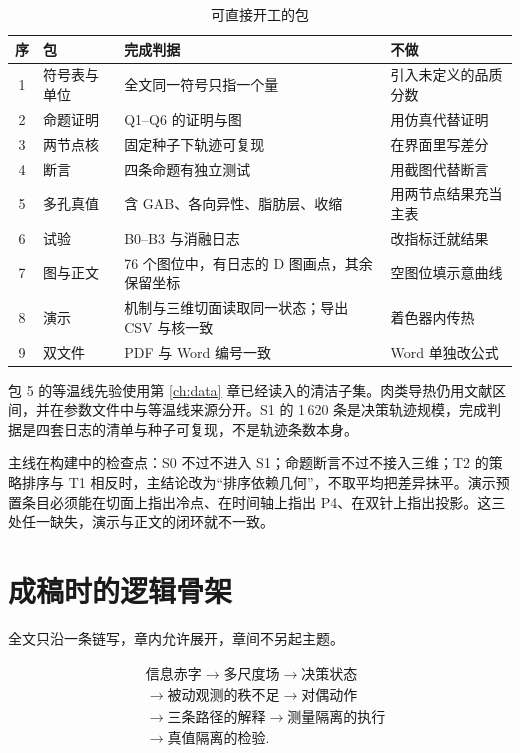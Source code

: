 \begin{table}[H]
\centering
\caption{可直接开工的包}
\begin{tabularx}{\textwidth}{clXX}
\toprule
序 & 包 & 完成判据 & 不做 \\
\midrule
1 & 符号表与单位 & 全文同一符号只指一个量 & 引入未定义的品质分数 \\
2 & 命题证明 & Q1--Q6 的证明与图 & 用仿真代替证明 \\
3 & 两节点核 & 固定种子下轨迹可复现 & 在界面里写差分 \\
4 & 断言 & 四条命题有独立测试 & 用截图代替断言 \\
5 & 多孔真值 & 含 GAB、各向异性、脂肪层、收缩 & 用两节点结果充当主表 \\
6 & 试验 & B0--B3 与消融日志 & 改指标迁就结果 \\
7 & 图与正文 & 76 个图位中，有日志的 D 图画点，其余保留坐标 & 空图位填示意曲线 \\
8 & 演示 & 机制与三维切面读取同一状态；导出 CSV 与核一致 & 着色器内传热 \\
9 & 双文件 & PDF 与 Word 编号一致 & Word 单独改公式 \\
\bottomrule
\end{tabularx}
\end{table}

包 5 的等温线先验使用第 \ref{ch:data} 章已经读入的清洁子集。肉类导热仍用文献区间，并在参数文件中与等温线来源分开。S1 的 1\,620 条是决策轨迹规模，完成判据是四套日志的清单与种子可复现，不是轨迹条数本身。

主线在构建中的检查点：S0 不过不进入 S1；命题断言不过不接入三维；T2 的策略排序与 T1 相反时，主结论改为“排序依赖几何”，不取平均把差异抹平。演示预置条目必须能在切面上指出冷点、在时间轴上指出 P4、在双针上指出投影。这三处任一缺失，演示与正文的闭环就不一致。

\section{成稿时的逻辑骨架}

全文只沿一条链写，章内允许展开，章间不另起主题。

\[
\begin{aligned}
&\text{信息赤字}
\to\text{多尺度场}
\to\text{决策状态}\\
&\to\text{被动观测的秩不足}
\to\text{对偶动作}\\
&\to\text{三条路径的解释}
\to\text{测量隔离的执行}\\
&\to\text{真值隔离的检验}.
\end{aligned}
\]

